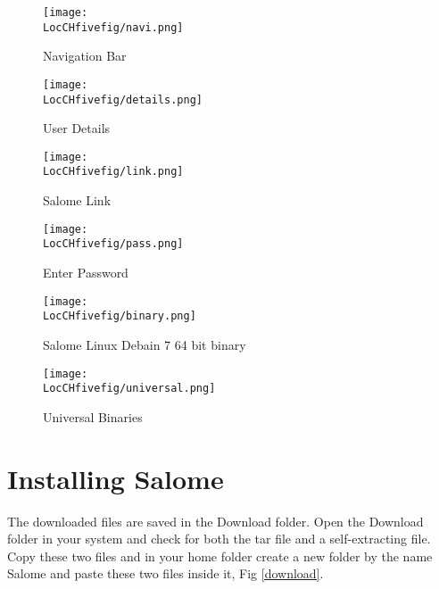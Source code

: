 \begin{figure}[h]  
\centering
\texttt{[image: \\LocCHfivefig/navi.png]}
\caption{Navigation Bar}
\label{navi}
\end{figure}

\begin{figure}[h]  
\centering
\texttt{[image: \\LocCHfivefig/details.png]}
\caption{User Details}
\label{details}
\end{figure}

\begin{figure}[h]  
\centering
\texttt{[image: \\LocCHfivefig/link.png]}
\caption{Salome Link}
\label{link}
\end{figure}

\begin{figure}[h]  
\centering
\texttt{[image: \\LocCHfivefig/pass.png]}
\caption{Enter Password}
\label{pass}
\end{figure}

\begin{figure}[h]  
\centering
\texttt{[image: \\LocCHfivefig/binary.png]}
\caption{Salome Linux Debain 7 64 bit binary}
\label{binary}
\end{figure}

\begin{figure}[h]  
\centering
\texttt{[image: \\LocCHfivefig/universal.png]}
\caption{Universal Binaries}
\label{univ}
\end{figure}

\section{Installing Salome}

The downloaded files are saved in the Download folder. Open the Download folder in your system and check for both the tar file and a self-extracting file.
Copy these two files and in your home folder create a new folder by the name Salome and paste these two files inside it, Fig \ref{download}.


